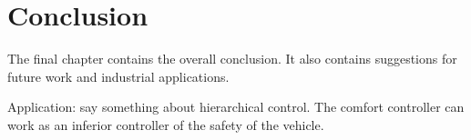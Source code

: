 \chapter{Conclusion}
\label{cha:conclusion}
The final chapter contains the overall conclusion. It also contains
suggestions for future work and industrial applications.


Application: say something about hierarchical control. The comfort controller can work as an inferior controller of the safety of the vehicle. 



